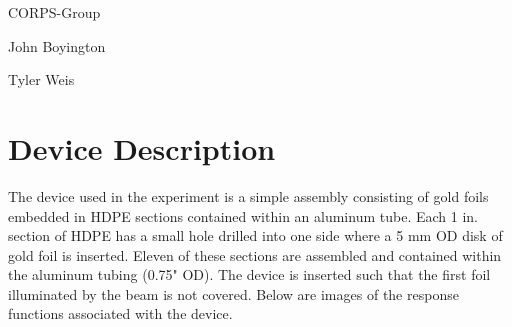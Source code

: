 \documentclass{amsart}
\theoremstyle{definition}
\begin{document}
\LARGE{CORPS-Group}
 
\large
John Boyington

Tyler Weis
\newline
\bigskip


\section{Device Description}
\bigskip

The device used in the experiment is a simple assembly consisting of gold foils embedded in HDPE sections contained within an aluminum tube.
Each 1 in. section of HDPE has a small hole drilled into one side where a 5 mm OD disk of gold foil is inserted.
Eleven of these sections are assembled and contained within the aluminum tubing (0.75" OD).
The device is inserted such that the first foil illuminated by the beam is not covered.
Below are images of the response functions associated with the device.
\end{document}

